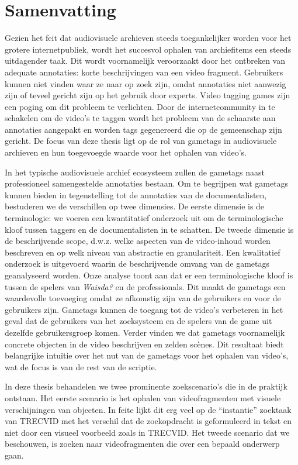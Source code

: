 \chapter*{Samenvatting}
\pagestyle{samenvatting}

Gezien het feit dat audiovisuele archieven steeds toegankelijker worden voor het grotere internetpubliek, wordt het succesvol ophalen van archiefitems een steeds uitdagender taak. Dit wordt voornamelijk veroorzaakt door het ontbreken van adequate annotaties: korte beschrijvingen van een video fragment. Gebruikers kunnen niet vinden waar ze naar op zoek zijn, omdat annotaties niet aanwezig zijn of teveel gericht zijn op
het gebruik door experts. Video tagging games zijn een poging om dit probleem te verlichten. Door de internetcommunity in te schakelen om de video's te taggen wordt het probleem van de schaarste
aan annotaties aangepakt en worden tags gegenereerd die op de gemeenschap zijn gericht. De focus van deze thesis ligt op de rol van gametags in audiovisuele archieven en hun toegevoegde waarde
voor het ophalen van video's.

In het typische audiovisuele archief ecosysteem zullen de gametags naast professioneel samengestelde annotaties bestaan. Om te begrijpen wat gametags kunnen bieden in tegenstelling
tot de annotaties van de documentalisten, bestuderen we de verschillen op twee dimensies. De eerste dimensie is de terminologie: we voeren een kwantitatief onderzoek uit om de terminologische
kloof tussen taggers en de documentalisten in te schatten. De tweede dimensie is de beschrijvende scope, d.w.z. welke aspecten van de video-inhoud worden beschreven en op welk niveau van abstractie en
granulariteit. Een kwalitatief onderzoek is uitgevoerd waarin de beschrijvende omvang van de gametags geanalyseerd worden. Onze analyse toont aan dat er een terminologische kloof is tussen
de spelers van \textit{Waisda?} en de professionals. Dit maakt de gametags een waardevolle toevoeging omdat ze afkomstig zijn van de gebruikers en voor de gebruikers zijn. Gametags kunnen de toegang tot de video's verbeteren in het geval dat de gebruikers van het zoeksysteem en de spelers van de game uit dezelfde gebruikersgroep komen. Verder vinden we dat gametags voornamelijk concrete objecten in de video beschrijven en zelden
scènes. Dit resultaat biedt belangrijke intuïtie over het nut van de gametags voor het ophalen van video's, wat de focus is van de rest van de scriptie.

In deze thesis behandelen we twee prominente zoekscenario's die in de praktijk ontstaan. Het eerste scenario is het ophalen van videofragmenten met visuele verschijningen van objecten. In feite lijkt dit erg veel op de ``instantie'' zoektaak van TRECVID met het verschil dat de zoekopdracht is geformuleerd in tekst en niet door een visueel voorbeeld zoals in TRECVID. Het tweede scenario dat we beschouwen, is zoeken naar videofragmenten die over een bepaald onderwerp gaan.


